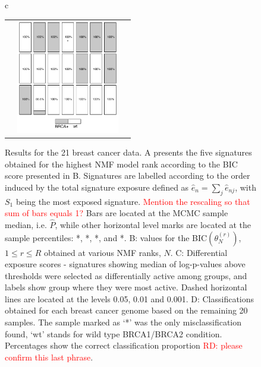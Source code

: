 \documentclass{bioinfo}
\begin{document}
\begin{figure}[t!]
\begin{tabular}{c}
\begin{tabular}{ccc}
     &
 \includegraphics[width=4.5cm]{figs/Classific}
   \end{tabular}
 \end{tabular}
 \caption{\textrm{%
    Results for the 21 breast cancer data. A presents the five
    signatures obtained for the highest NMF model rank according to the
    BIC score presented in B. Signatures are labelled according to the
    order induced by the total signature exposure defined as $\hat e_n =
    \sum_{j} \hat e_{nj}$, with $S_1$ being the most exposed
    signature. \textcolor{red}{Mention the rescaling so that sum of bars
    equals 1?}  Bars are located at the MCMC sample median,
    i.e. $\widehat P$, while other horizontal level marks are located
    at the sample percentiles: *, *, *, and *.
    B: values for the BIC$(\theta^{(r)}_N)$, $1 \leq r \leq R$ obtained at
    various NMF ranks, $N$. C: Differential exposure scores - signatures
    showing median of log-p-values above thresholds were selected as
    differentially active among groups, and labels show group where they
    were most active.  Dashed horizontal lines are located at 
    the levels 0.05, 0.01 and 0.001. D: Classifications
    obtained for each breast cancer genome based on the remaining 20
    samples. The sample marked as `*' was the only
    misclassification found, `wt' stands for wild type BRCA1/BRCA2
    condition. Percentages show the correct classification proportion
    \textcolor{red}{RD: please confirm this last phrase}.
  }
 }\label{fig:bcancer} 
\end{figure}
\end{document}
